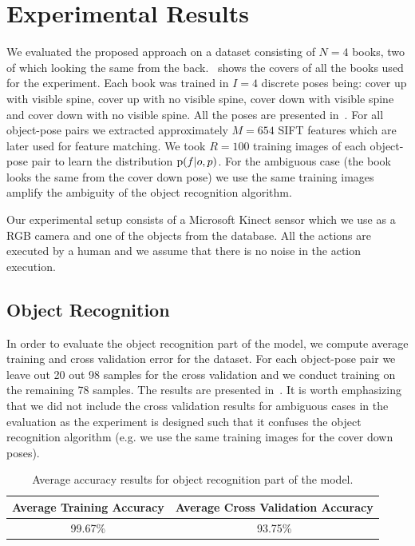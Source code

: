 \section{Experimental Results}



    We evaluated the proposed approach on a dataset consisting of $N = 4$ books, two of which looking the same from the back.~ shows the covers of all the books used for the experiment. Each book was trained in $I = 4$ discrete poses being: cover up with visible spine, cover up with no visible spine, cover down with visible spine and cover down with no visible spine. All the poses are presented in~. For all object-pose pairs we extracted approximately $M = 654$ SIFT features which are later used for feature matching. We took $R = 100$ training images of each object-pose pair to learn the distribution $\text{p}(f|o,p)$. For the ambiguous case (the book looks the same from the cover down pose) we use the same training images amplify the ambiguity of the object recognition algorithm.

    Our experimental setup consists of a Microsoft Kinect sensor which we use as a RGB camera and one of the objects from the database. All the actions are executed by a human and we assume that there is no noise in the action execution. 

    \subsection{Object Recognition}
        In order to evaluate the object recognition part of the model, we compute average training and cross validation error for the dataset. For each object-pose pair we leave out 20 out 98 samples for the cross validation and we conduct training on the remaining 78 samples. The results are presented in~. It is worth emphasizing that we did not include the cross validation results for ambiguous cases in the evaluation as the experiment is designed such that it confuses the object recognition algorithm (e.g. we use the same training images for the cover down poses).  
        
        \begin{table}[h]
                \centering
                \begin{tabular}{|c|c|}
                \hline
                Average Training Accuracy & Average Cross Validation Accuracy \\
                \hline
                99.67\% & 93.75\% \\
                \hline
                \end{tabular}
                \caption{Average accuracy results for object recognition part of the model.}
                \label{tab:accuracy}
		\end{table}

